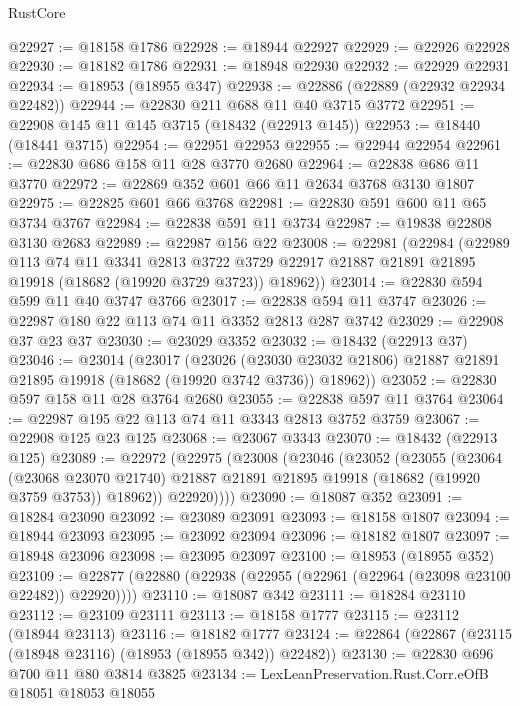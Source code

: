 \begin{lexlean}{RustCore}
\begin{coremodule}
@22927 := @18158 @1786
@22928 := @18944 @22927
@22929 := @22926 @22928
@22930 := @18182 @1786
@22931 := @18948 @22930
@22932 := @22929 @22931
@22934 := @18953 (@18955 @347)
@22938 := @22886 (@22889 (@22932 @22934 @22482))
@22944 := @22830 @211 @688 @11 @40 @3715 @3772
@22951 := @22908 @145 @11 @145 @3715 (@18432 (@22913 @145))
@22953 := @18440 (@18441 @3715)
@22954 := @22951 @22953
@22955 := @22944 @22954
@22961 := @22830 @686 @158 @11 @28 @3770 @2680
@22964 := @22838 @686 @11 @3770
@22972 := @22869 @352 @601 @66 @11 @2634 @3768 @3130 @1807
@22975 := @22825 @601 @66 @3768
@22981 := @22830 @591 @600 @11 @65 @3734 @3767
@22984 := @22838 @591 @11 @3734
@22987 := @19838 @22808 @3130 @2683
@22989 := @22987 @156 @22
@23008 := @22981
    (@22984
      (@22989
        @113
        @74
        @11
        @3341
        @2813
        @3722
        @3729
        @22917
        @21887
        @21891
        @21895
        @19918
        (@18682 (@19920 @3729 @3723))
        @18962))
@23014 := @22830 @594 @599 @11 @40 @3747 @3766
@23017 := @22838 @594 @11 @3747
@23026 := @22987 @180 @22 @113 @74 @11 @3352 @2813 @287 @3742
@23029 := @22908 @37 @23 @37
@23030 := @23029 @3352
@23032 := @18432 (@22913 @37)
@23046 := @23014
    (@23017
      (@23026
        (@23030 @23032 @21806)
        @21887
        @21891
        @21895
        @19918
        (@18682 (@19920 @3742 @3736))
        @18962))
@23052 := @22830 @597 @158 @11 @28 @3764 @2680
@23055 := @22838 @597 @11 @3764
@23064 := @22987 @195 @22 @113 @74 @11 @3343 @2813 @3752 @3759
@23067 := @22908 @125 @23 @125
@23068 := @23067 @3343
@23070 := @18432 (@22913 @125)
@23089 := @22972
    (@22975
      (@23008
        (@23046
          (@23052
            (@23055
              (@23064
                (@23068 @23070 @21740)
                @21887
                @21891
                @21895
                @19918
                (@18682 (@19920 @3759 @3753))
                @18962))
            @22920))))
@23090 := @18087 @352
@23091 := @18284 @23090
@23092 := @23089 @23091
@23093 := @18158 @1807
@23094 := @18944 @23093
@23095 := @23092 @23094
@23096 := @18182 @1807
@23097 := @18948 @23096
@23098 := @23095 @23097
@23100 := @18953 (@18955 @352)
@23109 := @22877 (@22880 (@22938 (@22955 (@22961 (@22964 (@23098 @23100 @22482)) @22920))))
@23110 := @18087 @342
@23111 := @18284 @23110
@23112 := @23109 @23111
@23113 := @18158 @1777
@23115 := @23112 (@18944 @23113)
@23116 := @18182 @1777
@23124 := @22864 (@22867 (@23115 (@18948 @23116) (@18953 (@18955 @342)) @22482))
@23130 := @22830 @696 @700 @11 @80 @3814 @3825
@23134 := LexLeanPreservation.Rust.Corr.eOfB @18051 @18053 @18055

\end{coremodule}
\end{lexlean}
